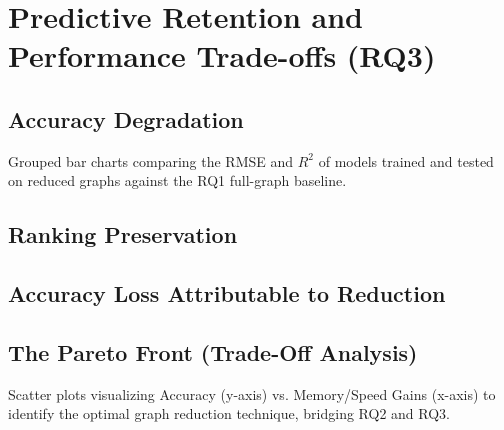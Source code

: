 \section{Predictive Retention and Performance Trade-offs (RQ3)}
\label{sec:results:rq3}

\subsection{Accuracy Degradation}
\label{sec:results:rq3:degradation}
Grouped bar charts comparing the RMSE and $R^2$ of models trained and tested on reduced graphs against the RQ1 full-graph baseline.


\subsection{Ranking Preservation}
\label{sec:results:rq3:ranking}

\subsection{Accuracy Loss Attributable to Reduction}
\label{sec:results:rq3:attribution}

\subsection{The Pareto Front (Trade-Off Analysis)}
\label{sec:results:rq3:pareto}
Scatter plots visualizing Accuracy (y-axis) vs. Memory/Speed Gains (x-axis) to identify the optimal graph reduction technique, bridging RQ2 and RQ3.


